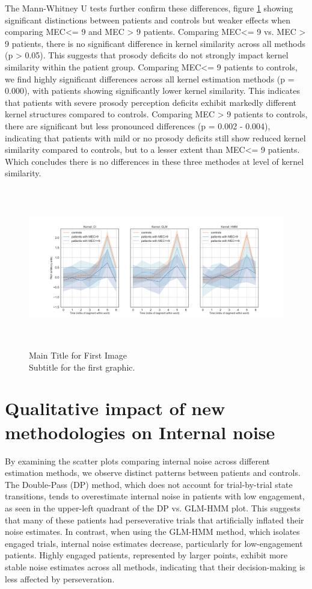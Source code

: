 The Mann-Whitney U tests further confirm these differences, figure \ref{fig:kernels_segments_types} showing significant distinctions between patients and controls but weaker effects when comparing MEC<= 9 and MEC > 9 patients.
Comparing MEC<= 9 vs. MEC > 9 patients, there is no significant difference in kernel similarity across all methods (p > 0.05). This suggests that prosody deficits do not strongly impact kernel similarity within the patient group.
Comparing MEC<= 9 patients to controls, we find highly significant differences across all kernel estimation methods (p = 0.000), with patients showing significantly lower kernel similarity. This indicates that patients with severe prosody perception deficits exhibit markedly different kernel structures compared to controls.
Comparing MEC > 9 patients to controls, there are significant but less pronounced differences (p = 0.002 - 0.004), indicating that patients with mild or no prosody deficits still show reduced kernel similarity compared to controls, but to a lesser extent than MEC<= 9 patients. 
Which concludes there is no differences in these three methodes at level of kernel similarity.
\begin{figure}[H]
    \centering
    \includegraphics[width=17cm,height=7cm]{MainLayout/Images/chapter8/kernels_segments_types.jpg}
    \caption{Main Title for First Image \\ \small Subtitle for the first graphic.}
    \label{fig:kernels_segments_types}
\end{figure}

\section{Qualitative impact of new methodologies on Internal noise}
By examining the scatter plots comparing internal noise across different estimation methods, we observe distinct patterns between patients and controls. The Double-Pass (DP) method, which does not account for trial-by-trial state transitions, tends to overestimate internal noise in patients with low engagement, as seen in the upper-left quadrant of the DP vs. GLM-HMM plot. This suggests that many of these patients had perseverative trials that artificially inflated their noise estimates. In contrast, when using the GLM-HMM method, which isolates engaged trials, internal noise estimates decrease, particularly for low-engagement patients. Highly engaged patients, represented by larger points, exhibit more stable noise estimates across all methods, indicating that their decision-making is less affected by perseveration.

